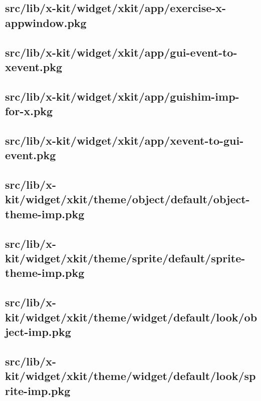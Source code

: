 \subsection{src/lib/x-kit/widget/xkit/app/exercise-x-appwindow.pkg}


\subsection{src/lib/x-kit/widget/xkit/app/gui-event-to-xevent.pkg}


\subsection{src/lib/x-kit/widget/xkit/app/guishim-imp-for-x.pkg}


\subsection{src/lib/x-kit/widget/xkit/app/xevent-to-gui-event.pkg}


\subsection{src/lib/x-kit/widget/xkit/theme/object/default/object-theme-imp.pkg}


\subsection{src/lib/x-kit/widget/xkit/theme/sprite/default/sprite-theme-imp.pkg}


\subsection{src/lib/x-kit/widget/xkit/theme/widget/default/look/object-imp.pkg}


\subsection{src/lib/x-kit/widget/xkit/theme/widget/default/look/sprite-imp.pkg}


